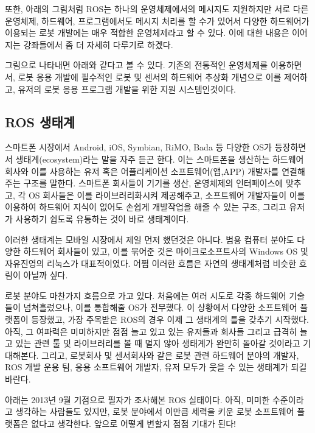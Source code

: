 또한, 아래의 그림처럼 ROS는 하나의 운영체제에서의 메시지도 지원하지만 서로 다른 운영체제, 하드웨어, 프로그램에서도 메시지 처리를 할 수가 있어서 다양한 하드웨어가 이용되는 로봇 개발에는 매우 적합한 운영체제라고 할 수 있다.
이에 대한 내용은 이어지는 강좌들에서 좀 더 자세히 다루기로 하겠다.  

그림으로 나타내면 아래와 같다고 볼 수 있다. 기존의 전통적인 운영체제를 이용하면서, 로봇 응용 개발에 필수적인 로봇 및 센서의 하드웨어 추상화 개념으로 이를 제어하고, 유저의 로봇 응용 프로그램 개발을 위한 지원 시스템인것이다.

\subsection{ROS 생태계}

스마트폰 시장에서 Android, iOS,  Symbian, RiMO, Bada 등 다양한 OS가 등장하면서 생태계(ecosystem)라는 말을 자주 듣곤 한다.
이는 스마트폰을 생산하는 하드웨어 회사와 이를 사용하는 유저 혹은 어플리케이션 소프트웨어(앱,APP) 개발자를 연결해주는 구조를 말한다.
스마트폰 회사들이 기기를 생산, 운영체제의 인터페이스에 맞추고, 각 OS 회사들은 이를 라이브러리화시켜 제공해주고, 소프트웨어 개발자들이 이를 이용하여 하드웨어 지식이 없어도 손쉽게 개발작업을 해줄 수 있는 구조, 그리고 유저가 사용하기 쉽도록 유통하는 것이 바로 생태계이다. 

이러한 생태계는 모바일 시장에서 제일 먼저 했던것은 아니다.
범용 컴퓨터 분야도 다양한 하드웨어 회사들이 있고, 이를 묶어준 것은 마이크로소프트사의 Windows OS 및 자유진영의 리눅스가 대표적이였다.
어쩜 이러한 흐름은 자연의 생태계처럼 비슷한 흐림이 아닐까 싶다. 

로봇 분야도 마찬가지 흐름으로 가고 있다.
처음에는 여러 시도로 각종 하드웨어 기술들이 넘쳐흘렀으나, 이를 통합해줄 OS가 전무했다.
이 상황에서 다양한 소프트웨어 플랫폼이 등장했고, 가장 주목받은 ROS의 경우 이제 그 생태계의 틀을 갖추기 시작했다.
아직, 그 여파력은 미미하지만 점점 늘고 있고 있는 유저들과 회사들 그리고 급격히 늘고 있는 관련 툴 및 라이브러리를 볼 때 멀지 않아 생태계가 완만히 돌아갈 것이라고 기대해본다.
그리고, 로봇회사 및 센서회사와 같은 로봇 관련 하드웨어 분야의 개발자, ROS 개발 운용 팀, 응용 소프트웨어 개발자, 유저 모두가 웃을 수 있는 생태계가 되길 바란다.
 
아래는 2013년 9월 기점으로 필자가 조사해본 ROS 실태이다.
아직, 미미한 수준이라고 생각하는 사람들도 있지만, 로봇 분야에서 이만큼 세력을 키운 로봇 소프트웨어 플랫폼은 없다고 생각한다.
앞으로 어떻게 변할지 점점 기대가 된다!

